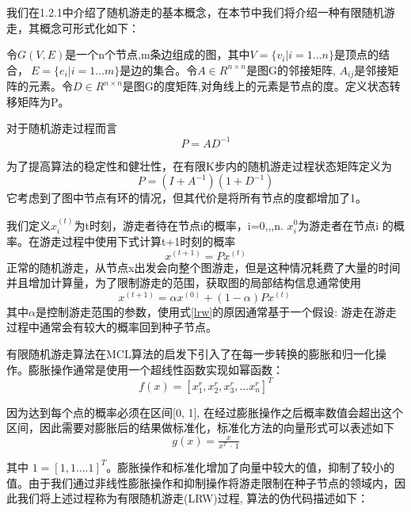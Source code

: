 我们在1.2.1中介绍了随机游走的基本概念，在本节中我们将介绍一种有限随机游走，其概念可形式化如下：

令$G(V,E)$是一个n个节点,m条边组成的图，其中$V=\{v_{i} |i=1...n\}$是顶点的结合，$\ E=\{e_{i} |i=1...m\}$是边的集合。令$A \in R^{n\times n}$是图G的邻接矩阵, $A_{ij}$是邻接矩阵的元素。令$D \in R^{n\times n}$是图G的度矩阵,对角线上的元素是节点的度。定义状态转移矩阵为P。

对于随机游走过程而言
\begin{equation}
	P = AD^{-1}
\end{equation}

为了提高算法的稳定性和健壮性，在有限K步内的随机游走过程状态矩阵定义为
\begin{equation}
	P=(I+A^{-1})(1+D^{-1})
\end{equation}
它考虑到了图中节点有环的情况，但其代价是将所有节点的度都增加了1。

我们定义$x_{i}^{(t)}$为t时刻，游走者待在节点i的概率，i=0,,,n. $x_{i}^{0}$为游走者在节点i 的概率。在游走过程中使用下式计算t+1时刻的概率
\begin{equation}
	x^{(t+1)}=Px^{(t)}
\end{equation}
正常的随机游走，从节点x出发会向整个图游走，但是这种情况耗费了大量的时间并且增加计算量，为了限制游走的范围，获取图的局部结构信息通常使用
 \begin{equation}
 x^{( t+1)} =\alpha x^{( 0)} +( 1-\alpha ) Px^{( t)} \
 \label{lrw}
 \end{equation}
 其中$\alpha$是控制游走范围的参数，使用式\ref{lrw}的原因通常基于一个假设: 游走在游走过程中通常会有较大的概率回到种子节点。

 有限随机游走算法在MCL算法的启发下引入了在每一步转换的膨胀和归一化操作。膨胀操作通常是使用一个超线性函数实现如幂函数：
 \begin{equation}
f( x) =\left[ x^{r}_{1} ,x^{r}_{2} ,x^{r}_{3} ,...x^{r}_{n}\right]^{T}
\label{inflation}
\end{equation}

因为达到每个点的概率必须在区间[0, 1], 在经过膨胀操作之后概率数值会超出这个区间，因此需要对膨胀后的结果做标准化，标准化方法的向量形式可以表述如下
 \begin{equation}
g( x) =\tfrac{x}{x^{T} \ \cdotp \ 1}
 \end{equation}

其中 $1 = [1,1....1]^{T}$。膨胀操作和标准化增加了向量中较大的值，抑制了较小的值。由于我们通过非线性膨胀操作和抑制操作将游走限制在种子节点的领域内，因此我们将上述过程称为有限随机游走(LRW)过程, 算法的伪代码描述如下：
\\
\\
\\

